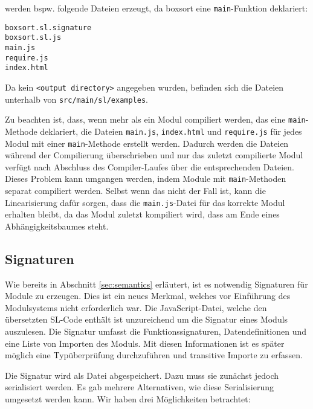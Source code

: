 \documentclass[runningheads]{llncs}
\begin{document}
\begin{description}
\begin{description}
        werden bspw. folgende Dateien erzeugt, da boxsort eine
        \texttt{main}-Funktion deklariert:
        
\begin{verbatim}
boxsort.sl.signature
boxsort.sl.js
main.js
require.js
index.html
\end{verbatim}

        Da kein \texttt{<output directory>} angegeben wurden, befinden
        sich die Dateien unterhalb von \texttt{src/main/sl/examples}.
        
        Zu beachten ist, dass, wenn mehr als ein Modul compiliert
        werden, das eine \texttt{main}-Methode deklariert, die Dateien
        \texttt{main.js}, \texttt{index.html} und \texttt{require.js}
        für jedes Modul mit einer \texttt{main}-Methode erstellt
        werden. Dadurch werden die Dateien während der Compilierung
        überschrieben und nur das zuletzt compilierte Modul verfügt
        nach Abschluss des Compiler-Laufes über die entsprechenden
        Dateien. Dieses Problem kann umgangen werden, indem Module mit
        \texttt{main}-Methoden separat compiliert werden. Selbst wenn
        das nicht der Fall ist, kann die Linearisierung dafür sorgen,
        dass die \texttt{main.js}-Datei für das korrekte Modul
        erhalten bleibt, da das Modul zuletzt kompiliert wird, dass
        am Ende eines Abhängigkeitsbaumes steht.
    \end{description}
\end{description}

\subsection{Signaturen}
\label{sec:compSig}

Wie bereits in Abschnitt \ref{sec:semantics} erläutert, ist es notwendig Signaturen für Module zu erzeugen. Dies ist ein neues Merkmal, welches vor Einführung des Modulsystems nicht erforderlich war. Die JavaScript-Datei, welche den übersetzten SL-Code enthält ist unzureichend um die Signatur eines Moduls auszulesen. Die Signatur umfasst die Funktionssignaturen, Datendefinitionen und eine Liste von Importen des Moduls. Mit diesen Informationen ist es später möglich eine Typüberprüfung durchzuführen und transitive Importe zu erfassen.

Die Signatur wird als Datei abgespeichert. Dazu muss sie zunächst jedoch serialisiert werden. Es gab mehrere Alternativen, wie diese Serialisierung umgesetzt werden kann. Wir haben drei Möglichkeiten betrachtet:
\end{document}
